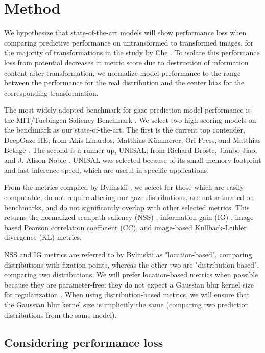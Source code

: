 \section{Method}
\label{sec:method}

We hypothesize that state-of-the-art models will show performance loss when comparing predictive performance on untransformed to transformed images, for the majority of transformations in the study by Che \etal \cite{gaze-transformations}. To isolate this performance loss from potential decreases in metric score due to destruction of information content after transformation, we normalize model performance to the range between the performance for the real distribution and the center bias for the corresponding transformation.

The most widely adopted benchmark for gaze prediction model performance is the MIT/Tuebingen Saliency Benchmark \cite{mit-tuebingen,made-easy}. We select two high-scoring models on the benchmark as our state-of-the-art. The first is the current top contender, DeepGaze IIE; from Akis Linardos, Matthias Kümmerer, Ori Press, and Matthias Bethge \cite{deepgazeiie}. The second is a runner-up, UNISAL; from Richard Droste, Jianbo Jiao, and J. Alison Noble \cite{unisal}. UNISAL was selected because of its small memory footprint and fast inference speed, which are useful in specific applications.

From the metrics compiled by Bylinskii \etal \cite{saliency-metrics}, we select for those which are easily computable, do not require altering our gaze distributions, are not saturated on benchmarks, and do not significantly overlap with other selected metrics. This returns the normalized scanpath saliency (NSS) \cite{nss}, information gain (IG) \cite{information-gain}, image-based Pearson correlation coefficient (CC), and image-based Kullback-Leibler divergence (KL) metrics.

NSS and IG metrics are referred to by Bylinskii \etal \cite{saliency-metrics} as "location-based", comparing distributions with fixation points, whereas the other two are "distribution-based", comparing two distributions. We will prefer location-based metrics when possible because they are parameter-free: they do not expect a Gaussian blur kernel size for regularization \cite{saliency-metrics,made-easy}. When using distribution-based metrics, we will ensure that the Gaussian blur kernel size is implicitly the same (comparing two prediction distributions from the same model).

\subsection{Considering performance loss}

